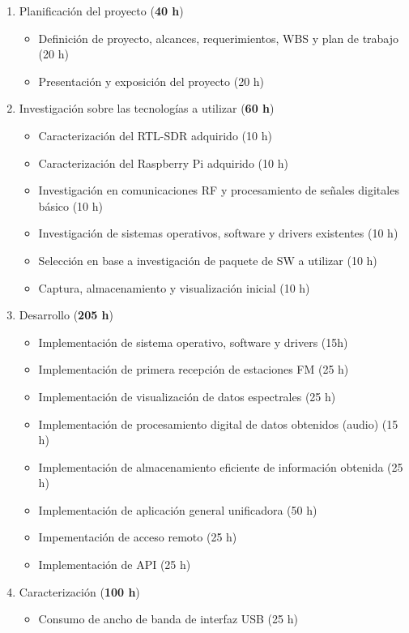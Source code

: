 \documentclass[
11pt, %
codirector, %
]{charter}
\begin{document}
\begin{enumerate}
	\item Planificación del proyecto (\textbf{40 h})
		\begin{itemize}
			\item Definición de proyecto, alcances, requerimientos, WBS y plan de trabajo (20 h)
			\item Presentación y exposición del proyecto (20 h)
		\end{itemize}
	\item Investigación sobre las tecnologías a utilizar (\textbf{60 h})
		\begin{itemize}
			\item Caracterización del RTL-SDR adquirido  (10 h)
			\item Caracterización del Raspberry Pi adquirido (10 h)
			\item Investigación en comunicaciones RF y procesamiento de señales digitales básico (10 h)
			\item Investigación de sistemas operativos, software y drivers existentes (10 h)
			\item Selección en base a investigación de paquete de SW a utilizar (10 h)
			\item Captura, almacenamiento y visualización inicial (10 h)
		\end{itemize}
	\item Desarrollo (\textbf{205 h})
		\begin{itemize}
			\item Implementación de sistema operativo, software y drivers (15h)
			\item Implementación de primera recepción de estaciones FM (25 h)
			\item Implementación de visualización de datos espectrales (25 h)
			\item Implementación de procesamiento digital de datos obtenidos (audio) (15 h)
			\item Implementación de almacenamiento eficiente de información obtenida (25 h)
			\item Implementación de aplicación general unificadora (50 h)
			\item Impementación de acceso remoto (25 h)
			\item Implementación de API (25 h)
		\end{itemize}
	\item Caracterización (\textbf{100 h})
		\begin{itemize}
			\item Consumo de ancho de banda de interfaz USB (25 h)

\end{itemize}
\end{enumerate}
\end{document}
